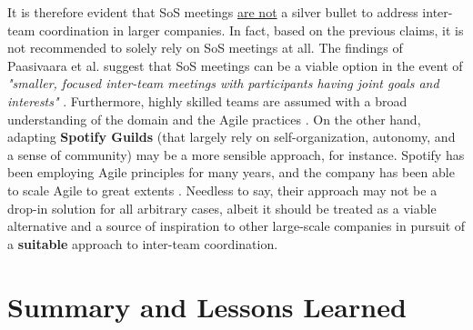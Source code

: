 \documentclass[conference]{IEEEtran}
\begin{document}
It is therefore evident that SoS meetings \underline{are not} a silver bullet
to address inter-team coordination in larger companies. In fact, based on the
previous claims, it is not recommended to solely rely on SoS meetings at all.
The findings of Paasivaara et al. suggest that SoS meetings can be a viable
option in the event of \textit{"smaller, focused inter-team meetings with
participants having joint goals and interests"} \cite{Paasivaara2012}.
Furthermore, highly skilled teams are assumed with a broad understanding of the
domain and the Agile practices \cite{Sutherland2007}. On the other hand,
adapting \textbf{Spotify Guilds} (that largely rely on self-organization,
autonomy, and a sense of community) \cite{Smite2019} may be a more sensible
approach, for instance. Spotify has been employing Agile principles for many
years, and the company has been able to scale Agile to great extents
\cite{Alqudah2016}. Needless to say, their approach may not be a drop-in
solution for all arbitrary cases, albeit it should be treated as a viable
alternative and a source of inspiration to other large-scale companies in
pursuit of a \textbf{suitable} approach to inter-team coordination.

\section{Summary and Lessons Learned}
\label{sec:summary}



\end{document}
